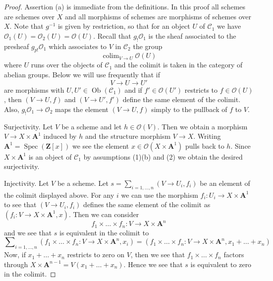 \documentclass[10pt,a4paper]{amsart}
\theoremstyle{plain}
\theoremstyle{definition}
\theoremstyle{remark}
\numberwithin{equation}{subsection}
\def\colim{\mathop{\mathrm{colim}}\nolimits}
\def\Spec{\mathop{\mathrm{Spec}}}
\def\Ob{\mathop{\mathrm{Ob}}\nolimits}
\begin{document}
\begin{proof}
Assertion (a) is immediate from the definitions.
In this proof all schemes are schemes over $X$ and all morphisms of
schemes are morphisms of schemes over $X$. Note that $g^{-1}$ is
given by restriction, so that for an object $U$ of $\mathcal{C}_1$
we have $\mathcal{O}_1(U) = \mathcal{O}_2(U) = \mathcal{O}(U)$.
Recall that $g_!\mathcal{O}_1$ is the sheaf associated to the presheaf
$g_{p!}\mathcal{O}_1$ which associates to $V$ in $\mathcal{C}_2$ the group
$$
\colim_{V \to U} \mathcal{O}(U)
$$
where $U$ runs over the objects of $\mathcal{C}_1$ and the colimit is
taken in the category of abelian groups. Below we will use frequently
that if
$$
V \to U \to U'
$$
are morphisms with $U, U' \in \Ob(\mathcal{C}_1)$
and if $f' \in \mathcal{O}(U')$ restricts to $f \in \mathcal{O}(U)$,
then $(V \to U, f)$ and $(V \to U', f')$ define the same element of the
colimit. Also, $g_!\mathcal{O}_1 \to \mathcal{O}_2$ maps the element
$(V \to U, f)$ simply to the pullback of $f$ to $V$.

\medskip\noindent
Surjectivity. Let $V$ be a scheme and let $h \in \mathcal{O}(V)$.
Then we obtain a morphism $V \to X \times \mathbf{A}^1$ induced by $h$
and the structure morphism $V \to X$. Writing
$\mathbf{A}^1 = \Spec(\mathbf{Z}[x])$ we see the element
$x \in \mathcal{O}(X \times \mathbf{A}^1)$ pulls
back to $h$. Since $X \times \mathbf{A}^1$ is an object of $\mathcal{C}_1$
by assumptions (1)(b) and (2) we obtain the desired surjectivity.

\medskip\noindent
Injectivity. Let $V$ be a scheme. Let
$s = \sum_{i = 1, \ldots, n} (V \to U_i, f_i)$ be an element of the colimit
displayed above. For any $i$ we can use the morphism
$f_i : U_i \to X \times \mathbf{A}^1$
to see that $(V \to U_i, f_i)$ defines the same element of the colimit as
$(f_i : V \to X \times \mathbf{A}^1, x)$. Then we can consider
$$
f_1 \times \ldots \times f_n : V \to X \times \mathbf{A}^n
$$
and we see that $s$ is equivalent in the colimit to
$$
\sum\nolimits_{i = 1, \ldots, n}
(f_1 \times \ldots \times f_n : V \to X \times \mathbf{A}^n, x_i) =
(f_1 \times \ldots \times f_n : V \to X \times \mathbf{A}^n,
x_1 + \ldots + x_n)
$$
Now, if $x_1 + \ldots + x_n$ restricts to zero on $V$, then we see
that $f_1 \times \ldots \times f_n$ factors through
$X \times \mathbf{A}^{n - 1} = V(x_1 + \ldots + x_n)$. Hence we see
that $s$ is equivalent to zero in the colimit.
\end{proof}
\end{document}
